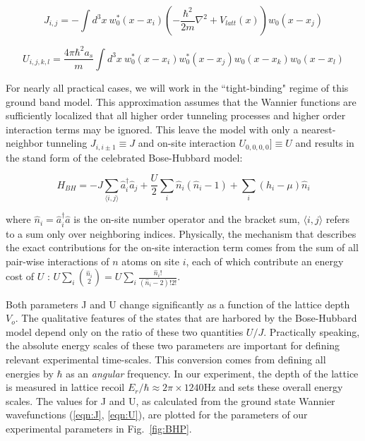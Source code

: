 \begin{equation}
J_{i,j} = - \int d^3 x ~ w^*_0 (x-x_i) \left ( - \frac{\hbar^2}{2m} \nabla^2 + V_{latt}(x) \right ) w_0(x-x_j) 
\label{eqn:J}
\end{equation}

\begin{equation}
U_{i,j,k,l} = \frac{4 \pi \hbar^2 a_s}{m} \int d^3 x ~  w^*_0 (x-x_i)  w^*_0 (x-x_j) w_0(x-x_k) w_0(x-x_l)
\label{eqn:U}
\end{equation}

For nearly all practical cases, we will work in the ``tight-binding" regime of this ground band model. This approximation assumes that the Wannier functions are sufficiently localized that all higher order tunneling processes and higher order interaction terms may be ignored. This leave the model with only a nearest-neighbor tunneling $J_{i,i\pm1}\equiv J$ and on-site interaction $U_{0,0,0,0}]\equiv U$ and results in the stand form of the celebrated Bose-Hubbard model:

\begin{equation}
H_{BH} = - J \sum_{\langle i,j \rangle} \hat{a}^\dagger_i \hat{a}_j + \frac{U}{2} \sum_i \hat{n}_i (\hat{n}_i-1) + \sum_i (h_i - \mu) \hat{n}_i
\label{eqn:BHC}
\end{equation}

where $\hat{n}_i = \hat{a}_i^\dagger \hat{a}$ is the on-site number operator and the bracket sum, $\langle i,j \rangle$ refers to a sum only over neighboring indices. Physically, the mechanism that describes the exact contributions for the on-site interaction term comes from the sum of all pair-wise interactions of $n$ atoms on site $i$, each of which contribute an energy cost of $U$ : $U \sum_i {\hat{n}_i \choose 2}  = U \sum_i \frac{\hat{n}_i!}{(\hat{n}_i-2)! 2!} $.


Both parameters J and U change significantly as a function of the lattice depth $V_o$. The qualitative features of the states that are harbored by the Bose-Hubbard model depend only on the ratio of these two quantities $U/J$. Practically speaking, the absolute energy scales of these two parameters are important for defining relevant experimental time-scales. This conversion comes from defining all energies by $\hbar$ as an \emph{angular} frequency. In our experiment, the depth of the lattice is measured in lattice recoil $E_r/\hbar \approx 2\pi \times 1240 \mathrm{Hz}$ and sets these overall energy scales. The values for J and U, as calculated from the ground state Wannier wavefunctions (\ref{eqn:J}, \ref{eqn:U}), are plotted for the parameters of our experimental parameters in Fig.~\ref{fig:BHP}. 

